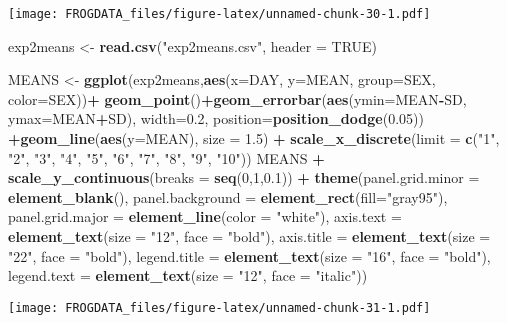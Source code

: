 \documentclass[]{article}
\newenvironment{Shaded}{\begin{snugshade}}{\end{snugshade}}
\newcommand{\KeywordTok}[1]{\textcolor[rgb]{0.13,0.29,0.53}{\textbf{#1}}}
\newcommand{\DataTypeTok}[1]{\textcolor[rgb]{0.13,0.29,0.53}{#1}}
\newcommand{\DecValTok}[1]{\textcolor[rgb]{0.00,0.00,0.81}{#1}}
\newcommand{\FloatTok}[1]{\textcolor[rgb]{0.00,0.00,0.81}{#1}}
\newcommand{\StringTok}[1]{\textcolor[rgb]{0.31,0.60,0.02}{#1}}
\newcommand{\OtherTok}[1]{\textcolor[rgb]{0.56,0.35,0.01}{#1}}
\newcommand{\OperatorTok}[1]{\textcolor[rgb]{0.81,0.36,0.00}{\textbf{#1}}}
\newcommand{\NormalTok}[1]{#1}
\begin{document}
\texttt{[image: FROGDATA\_files/figure-latex/unnamed-chunk-30-1.pdf]}

\begin{Shaded}
\begin{Highlighting}[]
\NormalTok{exp2means <-}\StringTok{ }\KeywordTok{read.csv}\NormalTok{(}\StringTok{"exp2means.csv"}\NormalTok{, }\DataTypeTok{header =} \OtherTok{TRUE}\NormalTok{)}

\NormalTok{MEANS <-}\StringTok{ }\KeywordTok{ggplot}\NormalTok{(exp2means,}\KeywordTok{aes}\NormalTok{(}\DataTypeTok{x=}\NormalTok{DAY, }\DataTypeTok{y=}\NormalTok{MEAN, }\DataTypeTok{group=}\NormalTok{SEX, }\DataTypeTok{color=}\NormalTok{SEX))}\OperatorTok{+}
\StringTok{  }\KeywordTok{geom_point}\NormalTok{()}\OperatorTok{+}\KeywordTok{geom_errorbar}\NormalTok{(}\KeywordTok{aes}\NormalTok{(}\DataTypeTok{ymin=}\NormalTok{MEAN}\OperatorTok{-}\NormalTok{SD, }\DataTypeTok{ymax=}\NormalTok{MEAN}\OperatorTok{+}\NormalTok{SD), }\DataTypeTok{width=}\FloatTok{0.2}\NormalTok{, }\DataTypeTok{position=}\KeywordTok{position_dodge}\NormalTok{(}\FloatTok{0.05}\NormalTok{)) }\OperatorTok{+}\KeywordTok{geom_line}\NormalTok{(}\KeywordTok{aes}\NormalTok{(}\DataTypeTok{y=}\NormalTok{MEAN), }\DataTypeTok{size =} \FloatTok{1.5}\NormalTok{) }\OperatorTok{+}\StringTok{ }\KeywordTok{scale_x_discrete}\NormalTok{(}\DataTypeTok{limit =} \KeywordTok{c}\NormalTok{(}\StringTok{"1"}\NormalTok{, }\StringTok{"2"}\NormalTok{, }\StringTok{"3"}\NormalTok{, }\StringTok{"4"}\NormalTok{, }\StringTok{"5"}\NormalTok{, }\StringTok{"6"}\NormalTok{, }\StringTok{"7"}\NormalTok{, }\StringTok{"8"}\NormalTok{, }\StringTok{"9"}\NormalTok{, }\StringTok{"10"}\NormalTok{))}
\NormalTok{MEANS }\OperatorTok{+}\StringTok{ }\KeywordTok{scale_y_continuous}\NormalTok{(}\DataTypeTok{breaks =} \KeywordTok{seq}\NormalTok{(}\DecValTok{0}\NormalTok{,}\DecValTok{1}\NormalTok{,}\FloatTok{0.1}\NormalTok{)) }\OperatorTok{+}\StringTok{ }\KeywordTok{theme}\NormalTok{(}\DataTypeTok{panel.grid.minor =} \KeywordTok{element_blank}\NormalTok{(), }\DataTypeTok{panel.background =} \KeywordTok{element_rect}\NormalTok{(}\DataTypeTok{fill=}\StringTok{"gray95"}\NormalTok{), }\DataTypeTok{panel.grid.major =} \KeywordTok{element_line}\NormalTok{(}\DataTypeTok{color =} \StringTok{"white"}\NormalTok{), }\DataTypeTok{axis.text =} \KeywordTok{element_text}\NormalTok{(}\DataTypeTok{size =} \StringTok{"12"}\NormalTok{, }\DataTypeTok{face =} \StringTok{"bold"}\NormalTok{), }\DataTypeTok{axis.title =} \KeywordTok{element_text}\NormalTok{(}\DataTypeTok{size =} \StringTok{"22"}\NormalTok{, }\DataTypeTok{face =} \StringTok{"bold"}\NormalTok{), }\DataTypeTok{legend.title =} \KeywordTok{element_text}\NormalTok{(}\DataTypeTok{size =} \StringTok{"16"}\NormalTok{, }\DataTypeTok{face =} \StringTok{"bold"}\NormalTok{), }\DataTypeTok{legend.text =} \KeywordTok{element_text}\NormalTok{(}\DataTypeTok{size =} \StringTok{"12"}\NormalTok{, }\DataTypeTok{face =} \StringTok{"italic"}\NormalTok{))}
\end{Highlighting}
\end{Shaded}

\texttt{[image: FROGDATA\_files/figure-latex/unnamed-chunk-31-1.pdf]}
\end{document}
